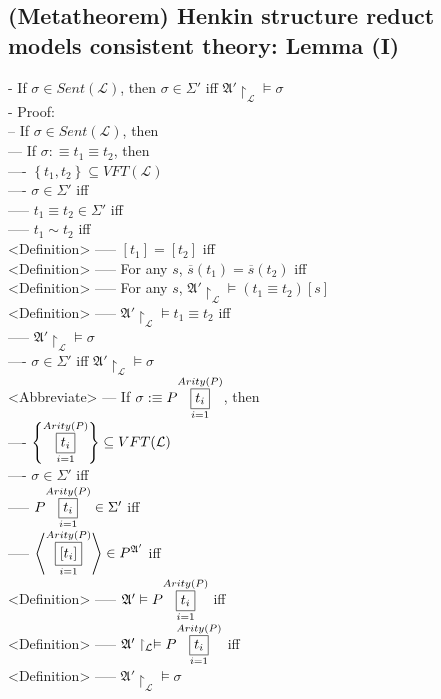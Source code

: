 \documentclass{book}
\newcommand{\is}{:\equiv}
\newcommand{\means}[2]{#1^{#2}}
\newcommand{\extend}[1]{\overline{#1}}
\newcommand{\set}[1]{\left\{ #1 \right\}}
\newcommand{\seq}[1]{\left\langle #1 \right\rangle}
\newcommand{\vdc}[3]{\underset{#2}{\overset{#3}{\fbox{$#1$}}}}
\begin{document}
\subsection{(Metatheorem) Henkin structure reduct models consistent theory: Lemma (I)}
	- If $\sigma \in Sent(\mathcal{L})$, then $\sigma \in \Sigma'$ iff $\mathfrak{A}' \upharpoonright_\mathcal{L} \vDash \sigma$ \\
	- Proof: \\
		-- If $\sigma \in Sent(\mathcal{L})$, then \\
			--- If $\sigma \is t_1 \equiv t_2$, then \\
				---- $\set{t_1, t_2} \subseteq VFT(\mathcal{L})$ \\
				---- $\sigma \in \Sigma'$ iff \\
					----- $t_1 \equiv t_2 \in \Sigma'$ iff \\
					----- $t_1 \sim t_2$ iff \\ <Definition>
					----- $[t_1] = [t_2]$ iff \\ <Definition>
					----- For any $s$, $\extend{s}(t_1) = \extend{s}(t_2)$ iff \\ <Definition>
					----- For any $s$, $\mathfrak{A}' \upharpoonright_\mathcal{L} \vDash (t_1 \equiv t_2)[s]$ \\ <Definition>
					----- $\mathfrak{A}' \upharpoonright_\mathcal{L} \vDash t_1 \equiv t_2$ iff \\
					----- $\mathfrak{A}' \upharpoonright_\mathcal{L} \vDash \sigma$ \\
				---- $\sigma \in \Sigma'$ iff $\mathfrak{A}' \upharpoonright_\mathcal{L} \vDash \sigma$ \\ <Abbreviate>
			--- If $\sigma \is P \vdc{t_i}{i=1}{Arity(P)}$, then \\
				---- $\set{\vdc{t_i}{i=1}{Arity(P)}} \subseteq VFT(\mathcal{L})$ \\
				---- $\sigma \in \Sigma'$ iff \\
					----- $P \vdc{t_i}{i=1}{Arity(P)} \in \Sigma'$ iff \\
					----- $\seq{\vdc{[t_i]}{i=1}{Arity(P)}} \in \means{P}{\mathfrak{A}'}$ iff \\ <Definition>
					----- $\mathfrak{A}' \vDash P \vdc{t_i}{i=1}{Arity(P)}$ iff \\ <Definition>
					----- $\mathfrak{A}' \upharpoonright_\mathcal{L} \vDash P \vdc{t_i}{i=1}{Arity(P)}$ iff \\ <Definition>
					----- $\mathfrak{A}' \upharpoonright_\mathcal{L} \vDash \sigma$ \\
\end{document}
